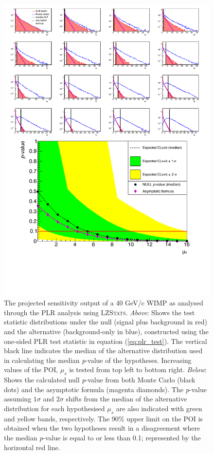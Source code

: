 {\begin{figure}[H!]
    \centering
    \vspace{-1cm}
    \includegraphics[scale=0.72]{Chapter_5/Figures/sensitivity_studies/statistical_distributions.pdf}
    \caption[The projected sensitivity output from the \textsc{LZStats} package used for the PLR analysis. The plot above shows all of the test statistic distributions under the null and the alternative hypothesis and the plot below shows the null \textit{p}-value calculated from the Monte Carlo and the asymptotic formula.]%
    {The projected sensitivity output of a 40 GeV/c\squared{} WIMP as analysed through the PLR analysis using \textsc{LZStats}. \textit{Above}: Shows the test statistic distributions under the null (signal plus background in red) and the alternative (background-only in blue), constructed using the one-sided PLR test statistic in equation (\ref{eq:plr_test}). The vertical black line indicates the median of the alternative distribution used in calculating the median \textit{p}-value of the hypotheses. Increasing values of the POI, $\mu_{s}$ is tested from top left to bottom right. \textit{Below}: Shows the calculated null \textit{p}-value from both Monte Carlo (black dots) and the asymptotic formula (magenta diamonds). The \textit{p}-value assuming $1\sigma$ and $2\sigma$ shifts from the median of the alternative distribution for each hypothesised $\mu_{s}$ are also indicated with green and yellow bands, respectively. The 90\% upper limit on the POI is obtained when the two hypotheses result in a disagreement where the median \textit{p}-value is equal to or less than 0.1; represented by the horizontal red line.}

\end{figure}}
